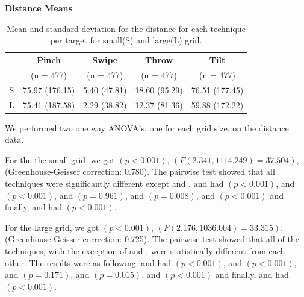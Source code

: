 \begin{table}[H]
	\centering
	\textbf{Distance Means}\\[4pt]
	\begin{adjustbox}{width=\columnwidth}
	\begin{tabular}{|c|c|c|c|c|}
		\hline
		\rowcolor[HTML]{9B9B9B} 
		& \textbf{Pinch} & \textbf{Swipe} & \textbf{Throw} & \textbf{Tilt} \\
		\rowcolor[HTML]{9B9B9B} 
		& (n = 477) & (n = 477) & (n = 477) & (n = 477) \\ \hline
		S & 75.97 (176.15) & 5.40 (47.81) & 18.60 (95.29)  & 76.51  (177.45) \\ \hline
		L & 75.41 (187.58) & 2.29 (38.82) & 12.37 (81.36) & 59.88 (172.22) \\ \hline
	\end{tabular}
	\end{adjustbox}
	\caption{Mean and standard deviation for the distance for each technique per target for small(S) and large(L) grid.}
	\label{tab:distance}
\end{table}

We performed two one way ANOVA's, one for each grid size, on the distance data.

For the the small grid, we got $(p<0.001)$, $(F(2.341, 1114.249)=37.504)$, (Greenhouse-Geisser correction: 0.780).
The pairwise test showed that all techniques were significantly different except \pinch and \tilt. 
\pinch and \swipe had $(p < 0.001)$, 
\pinch and \throw $(p <0.001)$, 
\pinch and \tilt $(p = 0.961)$, 
\swipe and \throw $(p = 0.008)$, 
\swipe and \tilt $(p < 0.001)$ and finally, 
\throw and \tilt had $(p < 0.001)$. 

For the large grid, we got $(p<0.001)$, $(F(2.176, 1036.004)=33.315)$, (Greenhouse-Geisser correction: 0.725).
The pairwise test showed that all of the techniques, with the exception of \pinch and \tilt, were statistically different from each other. The results were as following: 
\pinch and \swipe had $(p < 0.001)$, 
\pinch and \throw $(p <0.001)$, 
\pinch and \tilt $(p = 0.171)$, 
\swipe and \throw $(p = 0.015)$, 
\swipe and \tilt $(p < 0.001)$ and finally, 
\throw and \tilt had $(p < 0.001)$. 

